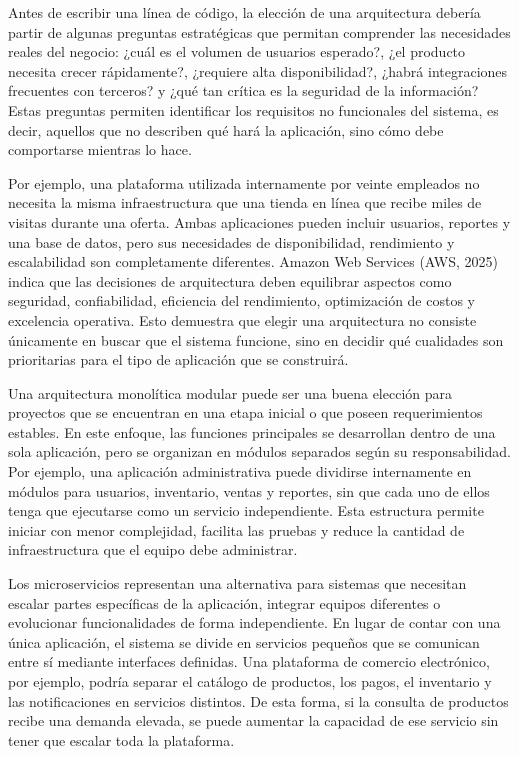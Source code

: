 \documentclass[12pt,letterpaper]{article}
\begin{document}
Antes de escribir una línea de código, la elección de una arquitectura debería partir de algunas preguntas estratégicas que permitan comprender las necesidades reales del negocio: ¿cuál es el volumen de usuarios esperado?, ¿el producto necesita crecer rápidamente?, ¿requiere alta disponibilidad?, ¿habrá integraciones frecuentes con terceros? y ¿qué tan crítica es la seguridad de la información? Estas preguntas permiten identificar los requisitos no funcionales del sistema, es decir, aquellos que no describen qué hará la aplicación, sino cómo debe comportarse mientras lo hace.

Por ejemplo, una plataforma utilizada internamente por veinte empleados no necesita la misma infraestructura que una tienda en línea que recibe miles de visitas durante una oferta. Ambas aplicaciones pueden incluir usuarios, reportes y una base de datos, pero sus necesidades de disponibilidad, rendimiento y escalabilidad son completamente diferentes. Amazon Web Services (AWS, 2025) indica que las decisiones de arquitectura deben equilibrar aspectos como seguridad, confiabilidad, eficiencia del rendimiento, optimización de costos y excelencia operativa. Esto demuestra que elegir una arquitectura no consiste únicamente en buscar que el sistema funcione, sino en decidir qué cualidades son prioritarias para el tipo de aplicación que se construirá.

Una arquitectura monolítica modular puede ser una buena elección para proyectos que se encuentran en una etapa inicial o que poseen requerimientos estables. En este enfoque, las funciones principales se desarrollan dentro de una sola aplicación, pero se organizan en módulos separados según su responsabilidad. Por ejemplo, una aplicación administrativa puede dividirse internamente en módulos para usuarios, inventario, ventas y reportes, sin que cada uno de ellos tenga que ejecutarse como un servicio independiente. Esta estructura permite iniciar con menor complejidad, facilita las pruebas y reduce la cantidad de infraestructura que el equipo debe administrar.

Los microservicios representan una alternativa para sistemas que necesitan escalar partes específicas de la aplicación, integrar equipos diferentes o evolucionar funcionalidades de forma independiente. En lugar de contar con una única aplicación, el sistema se divide en servicios pequeños que se comunican entre sí mediante interfaces definidas. Una plataforma de comercio electrónico, por ejemplo, podría separar el catálogo de productos, los pagos, el inventario y las notificaciones en servicios distintos. De esta forma, si la consulta de productos recibe una demanda elevada, se puede aumentar la capacidad de ese servicio sin tener que escalar toda la plataforma.
\end{document}
